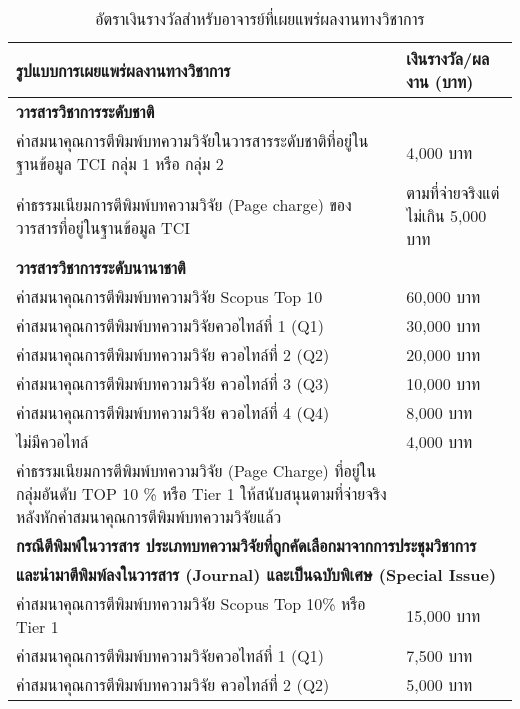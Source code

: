 \begin{center}
		\begin{longtable}{|p{}|p{}|}
			 \caption{อัตราเงินรางวัลสำหรับอาจารย์ที่เผยแพร่ผลงานทางวิชาการ}
			\label{Table:award}\\
			\hline
		   \textbf{รูปแบบการเผยแพร่ผลงานทางวิชาการ}	&\textbf{เงินรางวัล/ผลงาน (บาท)}\\
		  	 \hline
			\endhead
			\multicolumn{2}{|l|}{\textbf{วารสารวิชาการระดับชาติ}	
		}\\
			\hline
			ค่าสมนาคุณการตีพิมพ์บทความวิจัยในวารสารระดับชาติที่อยู่ในฐานข้อมูล TCI กลุ่ม 1 หรือ กลุ่ม 2	&4,000 บาท\\
			\hline
			ค่าธรรมเนียมการตีพิมพ์บทความวิจัย (Page   charge) ของวารสารที่อยู่ในฐานข้อมูล TCI      	&ตามที่จ่ายจริงแต่ไม่เกิน  5,000 บาท\\
			\hline
			\multicolumn{2}{|l|}{\textbf{วารสารวิชาการระดับนานาชาติ}}\\
			\hline
			ค่าสมนาคุณการตีพิมพ์บทความวิจัย Scopus Top 10%
			&60,000 บาท\\
			\hline
			ค่าสมนาคุณการตีพิมพ์บทความวิจัยควอไทล์ที่ 1 (Q1)         	&30,000 บาท	\\
			\hline
			ค่าสมนาคุณการตีพิมพ์บทความวิจัย ควอไทล์ที่ 2 (Q2)         	&20,000 บาท	\\
			\hline
			ค่าสมนาคุณการตีพิมพ์บทความวิจัย ควอไทล์ที่ 3 (Q3)         	&10,000 บาท\\
			\hline
			ค่าสมนาคุณการตีพิมพ์บทความวิจัย ควอไทล์ที่ 4 (Q4)         	&8,000 บาท	\\
			\hline
			ไม่มีควอไทล์ 	&4,000 บาท	\\
			\hline
			ค่าธรรมเนียมการตีพิมพ์บทความวิจัย (Page Charge) ที่อยู่ในกลุ่มอันดับ TOP 10 \% หรือ Tier 1 ให้สนับสนุนตามที่จ่ายจริงหลังหักค่าสมนาคุณการตีพิมพ์บทความวิจัยแล้ว  &\\
			\hline
			\multicolumn{2}{|l|}{\textbf{กรณีตีพิมพ์ในวารสาร ประเภทบทความวิจัยที่ถูกคัดเลือกมาจากการประชุมวิชาการ}}\\[-0.15cm]
				\multicolumn{2}{|l|}{\textbf{และนำมาตีพิมพ์ลงในวารสาร (Journal) และเป็นฉบับพิเศษ (Special Issue)}}\\
			\hline
			ค่าสมนาคุณการตีพิมพ์บทความวิจัย Scopus Top 10\% หรือ Tier 1	&15,000 บาท\\
			\hline
			ค่าสมนาคุณการตีพิมพ์บทความวิจัยควอไทล์ที่ 1 (Q1)         	&7,500 บาท\\
			\hline
			ค่าสมนาคุณการตีพิมพ์บทความวิจัย ควอไทล์ที่ 2 (Q2)         	&5,000 บาท\\

\end{longtable}
\end{center}
